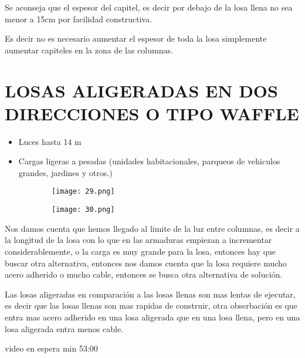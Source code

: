 Se aconseja que el espesor del capitel, es decir por debajo de la losa
llena no sea menor a 15cm por facilidad constructiva.

Es decir no es necesario aumentar el espesor de toda la losa
simplemente aumentar capiteles en la zona de las columnas.

\section{LOSAS ALIGERADAS EN DOS DIRECCIONES O TIPO WAFFLE}

\begin{itemize}
	\item Luces hasta 14 m
	\item {Cargas ligeras a pesadas (unidades habitacionales,
		parqueos de vehiculos grandes, jardines y otros.)}
\end{itemize}

\begin{figure}[H]
	\begin{subfigure}{0.5\textwidth}
	\centering
	\texttt{[image: 29.png]}
	\end{subfigure}
	\begin{subfigure}{0.5\textwidth}
	\centering
	\texttt{[image: 30.png]}
	\end{subfigure}
\end{figure}

Nos damos cuenta que hemos llegado al limite de la luz entre
columnas, es decir a la longitud de la losa con lo que en las
armaduras empiezan a incrementar considerablemente, o la carga
es muy grande para la losa, entonces hay que buscar otra
alternativa, entonces nos damos cuenta que la losa requiere
mucho acero adherido o mucho cable, entonces se busca otra
alternativa de solución.

Las losas aligeradas en comparación a las losas llenas
son mas lentas de ejecutar, es decir que las losas llenas
son mas rapidas de construir, otra obserbación es que entra
mas acero adherido en una losa aligerada que en una losa llena,
pero en una losa aligerada entra menos cable.

video en espera min 53:00
